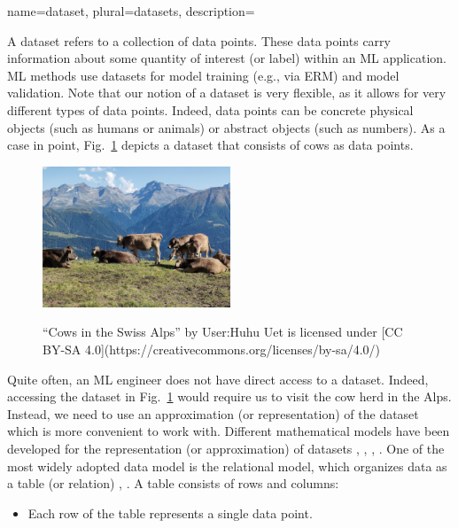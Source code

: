 {name={dataset}, plural={datasets},
	description={A dataset refers to a collection of data points. These 
		data points carry information about some quantity of interest (or label) within 
		an ML application. ML methods use datasets for model training (e.g., via ERM)
		and model validation. Note that our notion of a dataset is very flexible, as 
		it allows for very different types of data points. Indeed, data points can be concrete 
		physical objects (such as humans or animals) or abstract objects (such as numbers). 
		As a case in point, Fig.\ \ref{fig_cows_dataset} depicts a dataset that consists of cows as 
		data points. 
		\begin{figure}[H]
				\begin{center}
		\label{fig:cowsintheswissalps}
		\includegraphics[width=0.5\textwidth]{assets/Cows_in_the_Swiss_Alps.jpg}
		  \end{center}
		\caption{\label{fig_cows_dataset}“Cows in the Swiss Alps” by User:Huhu Uet is licensed under [CC BY-SA 4.0](https://creativecommons.org/licenses/by-sa/4.0/)}
	  \end{figure}
       Quite often, an ML engineer does not have direct access to a dataset. Indeed, accessing the 
       dataset in Fig.\ \ref{fig_cows_dataset} would require us to visit the cow herd in the Alps. Instead, 
       we need to use an approximation (or representation) of the dataset which is more convenient 
       to work with. Different mathematical models have been developed for the representation (or approximation) 
       of datasets \cite{silberschatz2019database}, \cite{abiteboul1995foundations}, \cite{hoberman2009data}, \cite{ramakrishnan2002database}. 
       One of the most widely adopted data model is the relational model, which organizes data 
       as a table (or relation) \cite{codd1970relational}, \cite{silberschatz2019database}.
		A table consists of rows and columns:
		\begin{itemize} 
		\item Each row of the table represents a single data point.

\end{itemize}}}
